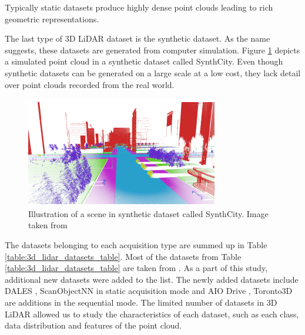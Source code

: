     Typically static datasets produce highly dense point clouds leading to rich geometric representations.
    
    The last type of 3D LiDAR dataset is the synthetic dataset. 
    As the name suggests, these datasets are generated from computer simulation. 
    Figure \ref{fig:synthetic} depicts a simulated point cloud in a synthetic dataset called SynthCity.
    Even though synthetic datasets can be generated on a large scale at a low cost, they lack detail over point clouds recorded from the real world.
    \begin{figure}[h!]
        \centering
        \includegraphics[scale=0.5]{images/synthcity.png}
        \caption{Illustration of a scene in synthetic dataset called SynthCity. Image taken from \cite{griffiths2019synthcity}}
        \label{fig:synthetic}
    \end{figure}
    
    The datasets belonging to each acquisition type are summed up in  Table \ref{table:3d_lidar_datasets_table}.
    Most of the datasets from Table \ref{table:3d_lidar_datasets_table} are taken from \cite{survey3d}. As a part of this study, additional new datasets were added to the list.
    The newly added datasets include DALES \cite{varney2020dales}, ScanObjectNN \cite{scanobejctnn} in static acquisition mode and AIO Drive \cite{Weng2020_AIODrive}, Toronto3D \cite{tan2020toronto3d} are additions in the sequential mode.
    The limited number of datasets in 3D LiDAR allowed us to study the characteristics of each dataset, such as each class, data distribution and features of the point cloud. 
    
